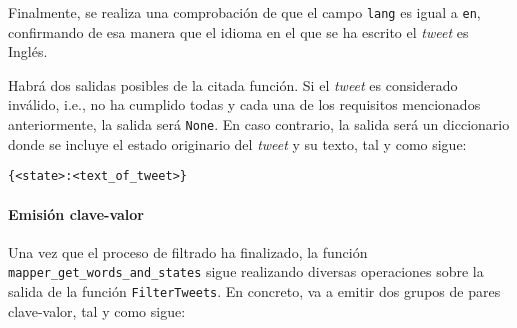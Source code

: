 \documentclass[10pt, spanish]{article}
\begin{document}
Finalmente, se realiza una comprobación de que el campo \texttt{lang} es igual a \texttt{en}, confirmando de esa manera que el idioma en el que se ha escrito el \textit{tweet} es Inglés. 

Habrá dos salidas posibles de la citada función. Si el \textit{tweet} es considerado inválido, i.e., no ha cumplido todas y cada una de los requisitos mencionados anteriormente, la salida será \texttt{None}. En caso contrario, la salida será un diccionario donde se incluye el estado originario del \textit{tweet} y su texto, tal y como sigue:

\texttt{\{<state>:<text\_of\_tweet>\}}

\paragraph{Emisión clave-valor}

Una vez que el proceso de filtrado ha finalizado, la función \texttt{mapper\_get\_words\_and\_states} sigue realizando diversas operaciones sobre la salida de la función \texttt{FilterTweets}. En concreto, va a emitir dos grupos de pares clave-valor, tal y como sigue:
\end{document}
